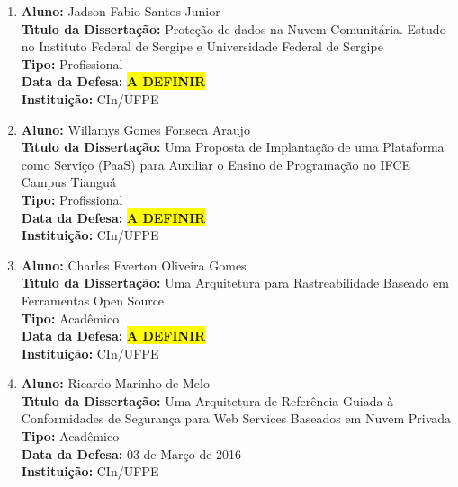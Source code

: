 \documentclass[a4paper,oneside,10pt]{article}
\begin{document}
\begin{enumerate}
\item       \textbf{Aluno:} Jadson Fabio Santos Junior \mbox{} \\
            \textbf{T\'{\i}tulo da Disserta\c{c}\~{a}o:} Proteção de dados na Nuvem Comunitária. Estudo no Instituto Federal de Sergipe e Universidade Federal de Sergipe\\
            \textbf{Tipo:} Profissional\\
            \textbf{Data da Defesa:} \colorbox{yellow}{\textbf{A DEFINIR}}\\
            \textbf{Institui\c{c}\~{a}o:} CIn/UFPE

\item       \textbf{Aluno:} Willamys Gomes Fonseca Araujo \mbox{} \\
            \textbf{T\'{\i}tulo da Disserta\c{c}\~{a}o:} Uma Proposta de Implantação de uma Plataforma como Serviço (PaaS) para Auxiliar o Ensino de Programação no IFCE Campus Tianguá\\
            \textbf{Tipo:} Profissional\\
            \textbf{Data da Defesa:} \colorbox{yellow}{\textbf{A DEFINIR}}\\
            \textbf{Institui\c{c}\~{a}o:} CIn/UFPE

\item       \textbf{Aluno:} Charles Everton Oliveira Gomes \mbox{} \\
            \textbf{T\'{\i}tulo da Disserta\c{c}\~{a}o:} Uma Arquitetura para Rastreabilidade Baseado em Ferramentas Open Source\\
            \textbf{Tipo:} Acadêmico\\
            \textbf{Data da Defesa:} \colorbox{yellow}{\textbf{A DEFINIR}}\\
            \textbf{Institui\c{c}\~{a}o:} CIn/UFPE

\item       \textbf{Aluno:} Ricardo Marinho de Melo \mbox{} \\
            \textbf{T\'{\i}tulo da Disserta\c{c}\~{a}o:} Uma Arquitetura de Referência Guiada à Conformidades de Segurança para Web Services Baseados em Nuvem Privada\\
            \textbf{Tipo:} Acadêmico\\
            \textbf{Data da Defesa:} 03 de Março de 2016\\
            \textbf{Institui\c{c}\~{a}o:} CIn/UFPE


\end{enumerate}
\end{document}
